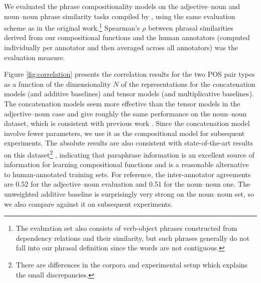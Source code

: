 \documentclass[11pt,letterpaper]{article}
\begin{document}
We evaluated the phrase compositionality models on the adjective--noun and noun--noun phrase similarity tasks compiled by , using the same evaluation scheme as in the original work.\footnote{The evaluation set also consists of verb-object phrases constructed from dependency relations and their similarity, but such phrases generally do not fall into our phrasal definition since the words are not contiguous.}
Spearman's $\rho$ between phrasal similarities derived from our compositional functions and the human annotators (computed individually per annotator and then averaged across all annotators) was the evaluation measure. 

Figure \ref{fig:correlation} presents the correlation results for the two POS pair types as a function of the dimensionality $N$ of the representations for the concatenation models (and additive baselines) and tensor models (and multiplicative baselines). 
The concatenation models seem more effective than the tensor models in the adjective--noun case and give roughly the same performance on the noun--noun dataset, which is consistent with previous work \cite{Guevara2011}. 
Since the concatenation model involve fewer parameters, we use it as the compositional model for subsequent experiments. 
The absolute results are also consistent with state-of-the-art results on this dataset\footnote{There are differences in the corpora and experimental setup which explains the small discrepancies.} \cite{Blacoe2012}, indicating that paraphrase information is an excellent source of information for learning compositional functions and is a reasonable alternative to human-annotated training sets. 
For reference, the inter-annotator agreements are 0.52 for the adjective--noun evaluation and 0.51 for the noun--noun one. 
The unweighted additive baseline is surprisingly very strong on the noun--noun set, so we also compare against it on subsequent experiments. 

\end{document}
